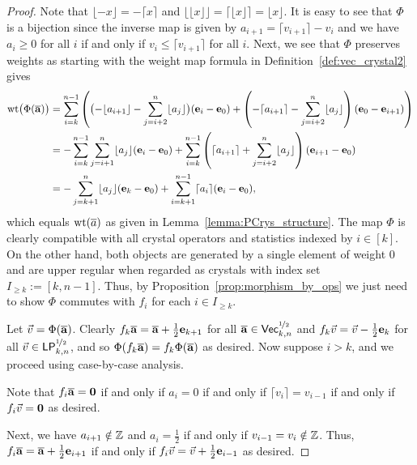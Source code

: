 \documentclass[11pt]{article}
\begin{document}
\begin{proof}
Note that $\lfloor -x \rfloor = -\lceil x \rceil$ and $\lfloor \lfloor x \rfloor \rfloor = \lceil \lfloor x \rfloor \rceil = \lfloor x \rfloor$.
It is easy to see that $\Phi$ is a bijection since the inverse map is given by $a_{i+1} = \lceil v_{i+1} \rceil - v_i$ and we have $a_i \geq 0$ for all $i$ if and only if $v_i \leq \lceil v_{i+1} \rceil$ for all $i$. 
Next, we see that $\Phi$ preserves weights as starting with the weight map formula in Definition~\ref{def:vec_crystal2} gives
\begin{align*}
\operatorname{wt}\bigl(\Phi(\overline{\mathbf{a}})\bigr) 
& = \sum_{i=k}^{n-1}\left( \bigl( -\lfloor a_{i+1} \rfloor - \sum_{j=i+2}^n \lfloor a_j \rfloor \bigr) (\textbf{e}_i-\textbf{e}_0) + \left( -\lceil a_{i+1} \rceil - \sum_{j=i+2}^n \lfloor a_j \rfloor \right) (\textbf{e}_0-\textbf{e}_{i+1})\right) \\
& = - \sum_{i=k}^{n-1} \sum_{j=i+1}^n \lfloor a_j \rfloor (\textbf{e}_i-\textbf{e}_0) + \sum_{i=k}^{n-1} \left( \lceil a_{i+1} \rceil + \sum_{j=i+2}^n \lfloor a_j \rfloor \right) (\textbf{e}_{i+1}-\textbf{e}_0) \\
& = -\sum_{j=k+1}^n \lfloor a_j \rfloor (\textbf{e}_k-\textbf{e}_0) + \sum_{i=k+1}^{n-1} \lceil a_i \rceil (\textbf{e}_i-\textbf{e}_0),
\end{align*}
which equals $\operatorname{wt}(\overline{a})$ as given in Lemma~\ref{lemma:PCrys_structure}. 
The map $\Phi$ is clearly compatible with all crystal operators and statistics indexed by $i \in [k]$. 
On the other hand, both  objects are generated by a single element of weight $0$ and are upper regular when regarded as crystals with index set $I_{\geq k} := [k,n-1]$.
Thus, by Proposition~\ref{prop:morphism_by_ops} we just need to show $\Phi$ commutes with 
$f_i$ for each $i \in I_{\geq k}$.

Let $\vec{v} = \Phi(\overline{\mathbf{a}})$.
Clearly $f_k \overline{\mathbf{a}} = \overline{\mathbf{a}} + \frac{1}{2} \textbf{e}_{k+1}$ for all $\overline{\mathbf{a}} \in \mathsf{Vec}^{\nicefrac{1}{2}}_{k,n}$ and $f_k \vec{v} = \vec{v} - \frac{1}{2} \textbf{e}_k$ for all $\vec{v} \in \mathsf{LP}^{\nicefrac{1}{2}}_{k,n}$, and so $\Phi(f_k \overline{\mathbf{a}}) = f_k \Phi(\overline{\mathbf{a}})$ as desired.
Now suppose $i > k$, and we proceed using case-by-case analysis.

Note that $f_i \overline{\mathbf{a}} = \boldsymbol{0}$ if and only if $a_i = 0$ if and only if $\lceil v_i \rceil = v_{i-1}$ if and only if $f_i \vec{v} = \boldsymbol{0}$ as desired.
 

Next, we have $a_{i+1} \notin \mathbb{Z}$ and $a_i = \frac{1}{2}$ if and only if $v_{i-1} = v_i \notin \mathbb{Z}$.
Thus, $f_i \overline{\mathbf{a}} = \overline{\mathbf{a}} + \frac{1}{2} \textbf{e}_{i+1}$ if and only if $f_i \vec{v} = \vec{v} + \frac{1}{2} \textbf{e}_{i-1}$ as desired.


\end{proof}
\end{document}
